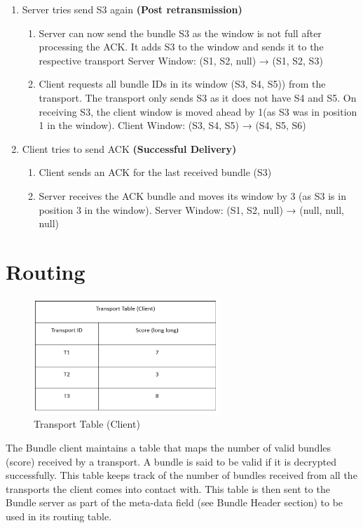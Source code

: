 \begin{enumerate} [start=0]
    \item Server tries send S3 again \textbf{(Post retransmission)}
    \begin{enumerate}
        \item Server can now send the bundle S3 as the window is not full after processing the ACK. It adds S3 to the window and sends it to the respective transport
            \subitem Server Window: (S1, S2, null) → (S1, S2, S3)
        \item Client requests all bundle IDs in its window (S3, S4, S5)) from the transport. The transport only sends S3 as it does not have S4 and S5. On receiving S3, the client window is moved ahead by 1(as S3 was in position 1 in the window).
            \subitem Client Window: (S3, S4, S5) → (S4, S5, S6)
    \end{enumerate}

    \item Client tries to send ACK  \textbf{(Successful Delivery)}
    \begin{enumerate}
        \item Client sends an ACK for the last received bundle (S3)
        \item Server receives the ACK bundle and moves its window by 3 (as S3 is in position 3 in the window).
            \subitem Server Window: (S1, S2, null) → (null, null, null)
    \end{enumerate}
\end{enumerate}

\section{Routing}

\begin{figure}[ht!]
\centering
\includegraphics[width= 70mm]{./images/Transport Table.png}
\caption{Transport Table (Client)}
\end{figure}

The Bundle client maintains a table that maps the number of valid bundles (score) received by a transport. A bundle is said to be valid if it is decrypted successfully. This table keeps track of the number of bundles received from all the transports the client comes into contact with. This table is then sent to the Bundle server as part of the meta-data field (see Bundle Header section) to be used in its routing table.

